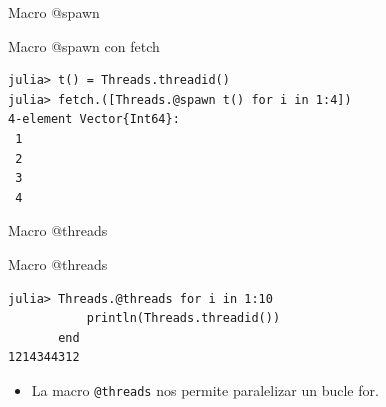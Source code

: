 \documentclass[bigger]{beamer}
\begin{document}
\begin{frame}[label={sec:org35cb32f},fragile]{Macro @spawn}
 \begin{block}{Macro @spawn con fetch}
\begin{verbatim}
julia> t() = Threads.threadid()
julia> fetch.([Threads.@spawn t() for i in 1:4])
4-element Vector{Int64}:
 1
 2
 3
 4
\end{verbatim}
\end{block}
\end{frame}

\begin{frame}[label={sec:orgfbe6852},fragile]{Macro @threads}
 \begin{block}{Macro @threads}
\begin{verbatim}
julia> Threads.@threads for i in 1:10
           println(Threads.threadid())
       end
1214344312
\end{verbatim}

\begin{itemize}
\item La macro \texttt{@threads} nos permite paralelizar un bucle for.
\end{itemize}
\end{block}
\end{frame}
\end{document}
